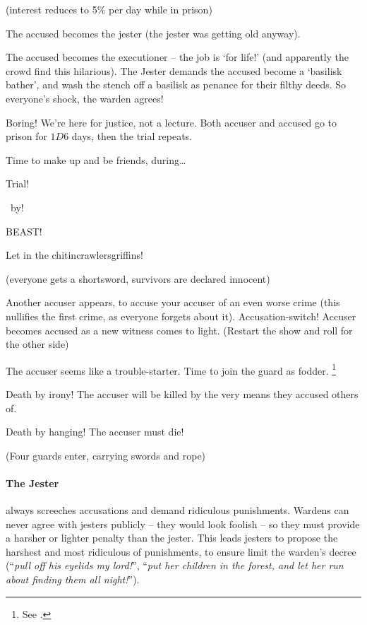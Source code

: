 \begin{multicols}{2}
\begin{dlist}
  (interest reduces to 5\% per day while in prison)
  \item
  The accused becomes the jester (the jester was getting old anyway).
  \item
  \ifodd\value{r3}
    The accused becomes the executioner -- the job is `for life!' (and apparently the crowd find this hilarious).
  \else
    The Jester demands the accused become a `basilisk bather', and wash the stench off a basilisk as penance for their filthy deeds.
    So everyone's shock, the warden agrees!
  \fi
  \item
  Boring!
  We're here for justice, not a lecture.
  Both accuser and accused go to prison for $1D6$ days, then the trial repeats.
  \item
  Time to make up and be friends, during\ldots

  Trial!

  ~by!

  BEAST!

  Let in the \ifodd\value{r4} chitincrawlers\else griffins\fi!

  (everyone gets a shortsword, survivors are declared innocent)
  \item
  \ifodd\value{r3}
    Another accuser appears, to accuse your accuser of an even worse crime (this nullifies the first crime, as everyone forgets about it).
  \else
    Accusation-switch!
    Accuser becomes accused as a new witness comes to light.
    (Restart the show and roll for the other side)
  \fi
  \item
  The accuser seems like a trouble-starter.
  Time to join the \gls{guard} as fodder.%
  \footnote{See .}
  \item
  Death by irony!
  The accuser will be killed by the very means they accused others of.
  \item
  Death by hanging!
  The accuser must die!

  (Four guards enter, carrying swords and rope)
\end{dlist}

\paragraph[the Jester]{The Jester}
\label{guildJester}%
always screeches accusations and demand ridiculous punishments.
Wardens can never agree with jesters publicly -- they would look foolish -- so they must provide a harsher or lighter penalty than the jester.
This leads jesters to propose the harshest and most ridiculous of punishments, to ensure limit the warden's decree (``\emph{pull off his eyelids my lord!}'', ``\emph{put her children in the forest, and let her run about finding them all night!}'').


\end{multicols}
